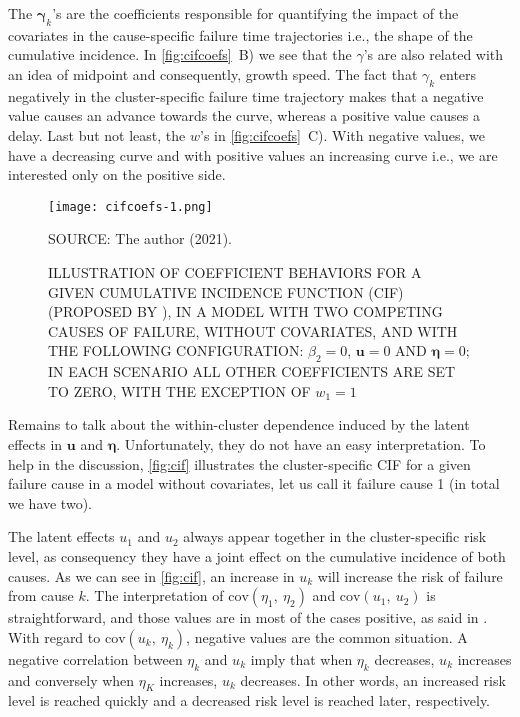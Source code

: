 The \(\bm{\gamma}_{k}\)'s are the coefficients responsible for
quantifying the impact of the covariates in the cause-specific failure
time trajectories i.e., the shape of the cumulative incidence. In
\autoref{fig:cifcoefs}~B) we see that the \(\gamma\)'s are also related
with an idea of midpoint and consequently, growth speed. The fact that
\(\gamma_{k}\) enters negatively in the cluster-specific failure time
trajectory makes that a negative value causes an advance towards the
curve, whereas a positive value causes a delay. Last but not least, the
\(w\)'s in \autoref{fig:cifcoefs}~C). With negative values, we have a
decreasing curve and with positive values an increasing curve i.e., we
are interested only on the positive side.

\begin{figure}[H]
 \setlength{\abovecaptionskip}{.0001pt}
 \caption{ILLUSTRATION OF COEFFICIENT BEHAVIORS FOR A GIVEN CUMULATIVE
          INCIDENCE FUNCTION (CIF) (PROPOSED BY ),
          IN A MODEL WITH TWO COMPETING CAUSES OF FAILURE, WITHOUT
          COVARIATES, AND WITH THE FOLLOWING CONFIGURATION: \(\beta_{2}
          = 0\), \(\bm{u} = 0\) AND \(\bm{\eta} = 0\); IN EACH SCENARIO
          ALL OTHER COEFFICIENTS ARE SET TO ZERO, WITH THE EXCEPTION
          OF \(w_{1} = 1\)}
 \vspace{0.2cm}\centering
 \texttt{[image: cifcoefs-1.png]}\\
 \begin{footnotesize}
  SOURCE: The author (2021).
 \end{footnotesize}
 \label{fig:cifcoefs}
\end{figure}

Remains to talk about the within-cluster dependence induced by the
latent effects in \(\bm{u}\) and \(\bm{\eta}\). Unfortunately, they do
not have an easy interpretation. To help in the discussion,
\autoref{fig:cif} illustrates the cluster-specific CIF for a given
failure cause in a model without covariates, let us call it failure
cause 1 (in total we have two).

The latent effects \(u_{1}\) and \(u_{2}\) always appear together in the
cluster-specific risk level, as consequency they have a joint effect on
the cumulative incidence of both causes. As we can see in
\autoref{fig:cif}, an increase in \(u_{k}\) will increase the risk of
failure from cause \(k\). The interpretation of
\(\text{cov}(\eta_{1},~\eta_{2})\) and \(\text{cov}(u_{1},~u_{2})\) is
straightforward, and those values are in most of the cases positive, as
said in . With regard to
\(\text{cov}(u_{k},~\eta_{k})\), negative values are the common
situation. A negative correlation between \(\eta_{k}\) and \(u_{k}\)
imply that when \(\eta_{k}\) decreases, \(u_{k}\) increases and
conversely when \(\eta_{K}\) increases, \(u_{k}\) decreases. In other
words, an increased risk level is reached quickly and a decreased risk
level is reached later, respectively.

